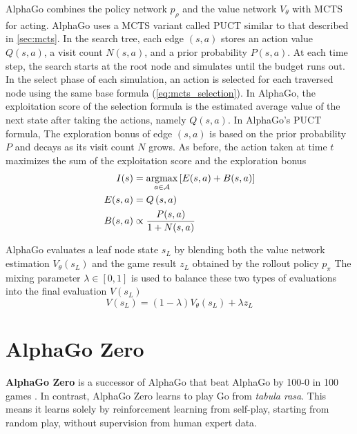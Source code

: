 AlphaGo combines the policy network $p_{\rho}$ and the value network $V_{\theta}$ with MCTS for acting.
AlphaGo uses a MCTS variant called PUCT similar to that described in \ref{sec:mcts}.
In the search tree, each edge $(s, a)$ stores an action value $Q(s, a)$, a visit count $N(s, a)$, and a prior probability $P(s, a)$.
At each time step, the search starts at the root node and simulates until the budget runs out.
In the select phase of each simulation, an action is selected for each traversed node using the same base formula (\ref{eq:mcts_selection}).
In AlphaGo, the exploitation score of the selection formula is the estimated average value of the next state after taking the actions, namely $Q(s, a)$.
In AlphaGo's PUCT formula, The exploration bonus of edge $(s, a)$ is based on the prior probability $P$ and decays as its visit count $N$ grows.
As before, the action taken at time $t$ maximizes the sum of the exploitation score and the exploration bonus
\begin{align*}
    I(s)     & = \operatorname*{argmax}_{a \in \mathcal{A}}\left[ E(s, a)+B(s, a) \right]  \\
    E(s, a)  & = Q\left(s, a\right)  \\
    B(s, a)  & \propto \frac{P(s, a)}{1 + N(s, a)}  \\
\end{align*}

AlphaGo evaluates a leaf node state $s_L$ by blending both the value network estimation $V_\theta(s_L)$ and the game result $z_L$ obtained by the rollout policy $p_\pi$
The mixing parameter $\lambda \in [0, 1]$ is used to balance these two types of evaluations into the final evaluation $V(s_L)$
$$
    V\left(s_{L}\right)=(1-\lambda) V_{\theta}\left(s_{L}\right)+\lambda z_{L}
$$

\section{AlphaGo Zero}
\textbf{AlphaGo Zero} is a successor of AlphaGo that beat AlphaGo by 100-0 in 100 games \cite{MasteringGameGo_Silver.Schrittwieser.ea_2017}.
In contrast, AlphaGo Zero learns to play Go from \textit{tabula rasa}.
This means it learns solely by reinforcement learning from self-play, starting from random play, without supervision from human expert data.

